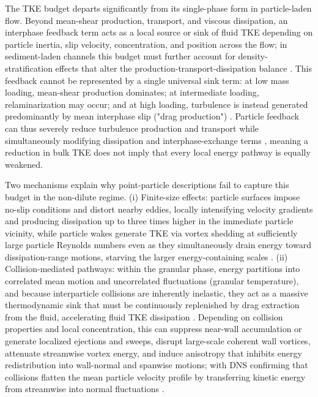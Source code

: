The TKE budget departs significantly from its single-phase form in particle-laden flow. Beyond mean-shear production, transport, and viscous dissipation, an interphase feedback term acts as a local source or sink of fluid TKE depending on particle inertia, slip velocity, concentration, and position across the flow; in sediment-laden channels this budget must further account for density-stratification effects that alter the production-transport-dissipation balance \cite{brandt__2022,capecelatro__2018,gualtieri__2023,guta__2024,vreman__2015,PEND_Zhao2013}. This feedback cannot be represented by a single universal sink term: at low mass loading, mean-shear production dominates; at intermediate loading, relaminarization may occur; and at high loading, turbulence is instead generated predominantly by mean interphase slip ("drag production") \cite{capecelatro__2018,gualtieri__2023}. Particle feedback can thus severely reduce turbulence production and transport while simultaneously modifying dissipation and interphase-exchange terms \cite{vreman__2015,zhou__2020}, meaning a reduction in bulk TKE does not imply that every local energy pathway is equally weakened.

Two mechanisms explain why point-particle descriptions fail to capture this budget in the non-dilute regime. (i) Finite-size effects: particle surfaces impose no-slip conditions and distort nearby eddies, locally intensifying velocity gradients and producing dissipation up to three times higher in the immediate particle vicinity, while particle wakes generate TKE via vortex shedding at sufficiently large particle Reynolds numbers even as they simultaneously drain energy toward dissipation-range motions, starving the larger energy-containing scales \cite{balachandar__2010,brandt__2022,capecelatro__2018,PEND_Finn2016,guta__2024,zhang__2025,PEND_Zhao2013}. (ii) Collision-mediated pathways: within the granular phase, energy partitions into correlated mean motion and uncorrelated fluctuations (granular temperature), and because interparticle collisions are inherently inelastic, they act as a massive thermodynamic sink that must be continuously replenished by drag extraction from the fluid, accelerating fluid TKE dissipation \cite{afkhami__2015,capecelatro__2018,chauchat__2017,vreman__2015}. Depending on collision properties and local concentration, this can suppress near-wall accumulation or generate localized ejections and sweeps, disrupt large-scale coherent wall vortices, attenuate streamwise vortex energy, and induce anisotropy that inhibits energy redistribution into wall-normal and spanwise motions; with DNS confirming that collisions flatten the mean particle velocity profile by transferring kinetic energy from streamwise into normal fluctuations \cite{hu__2025,PEND_Lee2015,PEND_Liu2022,nasr__2009,ven__2024,vreman__2015}.

